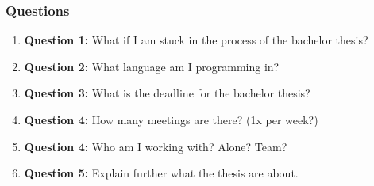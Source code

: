 \documentclass{article}
\begin{document}
\subsubsection*{Questions}

\begin{enumerate}[label=\textbf{\arabic*.}]
    \item \textbf{Question 1:} What if I am stuck in the process of the bachelor thesis?
    \vspace{2cm}
    
    \item \textbf{Question 2:} What language am I programming in?
    \vspace{2cm}
    
    \item \textbf{Question 3:} What is the deadline for the bachelor thesis?
    \vspace{2cm}

    \item \textbf{Question 4:} How many meetings are there? (1x per week?) 
    \vspace{2cm}

    \item \textbf{Question 4:} Who am I working with? Alone? Team? 
    \vspace{2cm}

    \item \textbf{Question 5:} Explain further what the thesis are about.
    \vspace{2cm}




\end{enumerate}
\end{document}
